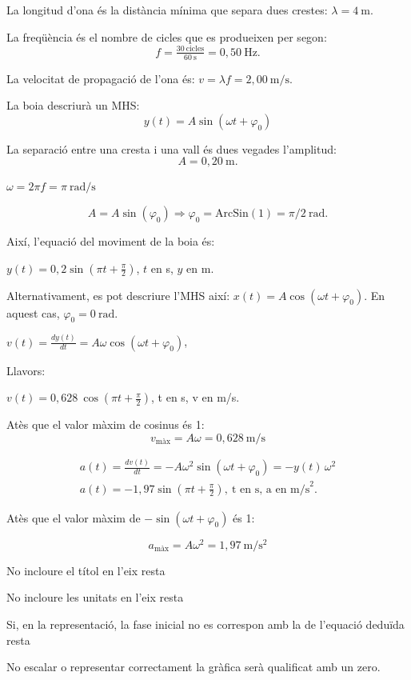 \begin{solapartat}
 La longitud d'ona és la distància mínima que separa dues crestes: $\lambda = 4\ \mathrm{m}$.

 La freqüència és el nombre de cicles que es produeixen per segon:
\[ f = \tfrac{30\ \mathrm{cicles}}{60\ \mathrm{s}} = 0,50\ \mathrm{Hz}. \]

 La velocitat de propagació de l'ona és: $v = \lambda f = 2,00\ \mathrm{m/s}$.

 La boia descriurà un MHS:
\[ y(t) = A\sin(\omega t + \varphi_0) \]

 La separació entre una cresta i una vall és dues vegades l'amplitud:
\[ A = 0,20\ \mathrm{m}. \]

 $\omega = 2\pi f = \pi\ \mathrm{rad/s}$

\[ A = A\sin(\varphi_0) \Rightarrow \varphi_0 = \mathrm{ArcSin}(1) = \pi/2\ \mathrm{rad}. \]

 Així, l'equació del moviment de la boia és:

$y(t) = 0,2\sin\left(\pi t + \frac{\pi}{2}\right)$, $t$ en s, $y$ en m.

Alternativament, es pot descriure l'MHS així: $x(t) = A\cos(\omega t + \varphi_0)$. En aquest cas, $\varphi_0 = 0\ \mathrm{rad}$.
\end{solapartat}

\begin{solapartat}
 $v(t) = \frac{dy(t)}{dt} = A\omega\cos(\omega t + \varphi_0)$,

Llavors:

$v(t) = 0,628\ \cos\left(\pi t + \frac{\pi}{2}\right)$, t en s, v en m/s.

Atès que el valor màxim de cosinus és 1:
\[ v_\text{màx} = A\omega = 0,628\ \mathrm{m/s} \]

\begin{gather*}
a(t) = \frac{dv(t)}{dt} = -A\omega^2\sin(\omega t + \varphi_0) = -y(t)\,\omega^2\\
a(t) = -1,97\sin\left(\pi t + \frac{\pi}{2}\right),\ \text{t en s, a en m/s}^2.
\end{gather*}
\begin{center}
Atès que el valor màxim de $-\sin(\omega t + \varphi_0)$ és 1:
\end{center}
\[ a_\text{màx} = A\omega^2 = 1,97\ \mathrm{m/s^2} \]

 
No incloure el títol en l'eix resta 

No incloure les unitats en l'eix resta 

Si, en la representació, la fase inicial no es correspon amb la de l'equació deduïda resta 

No escalar o representar correctament la gràfica serà qualificat amb un zero.
\end{solapartat}
